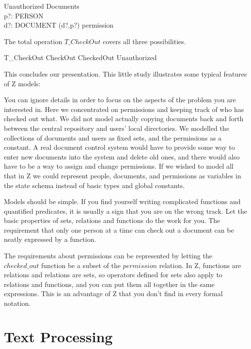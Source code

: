 \documentclass{article}
\begin{document}
\begin{schema}{Unauthorized}
	\Xi Documents \\
	p?: PERSON \\
 	d?: DOCUMENT
\where
	(d?,p?) \notin permission
\end{schema}
The total operation $T\_CheckOut$ covers all three possibilities.

\begin{zed}
	T\_CheckOut  CheckOut \lor CheckedOut \lor Unauthorized
\end{zed}
This concludes our presentation.  This little study illustrates some 
typical features of Z models:

You can ignore details in order to focus on the aspects of the problem
you are interested in.  Here we concentrated on permissions and
keeping track of who has checked out what.  We did not model actually
copying documents back and forth between the central repository and
users' local directories.  We modelled the collections of documents
and users as fixed sets, and the permissions as a constant.  A real
document control system would have to provide some way to enter new
documents into the system and delete old ones, and there would also
have to be a way to assign and change permissions.  If we wished to 
model all that in Z we could represent people, documents, and
permissions as variables in the state schema instead of basic types
and global constants.

Models should be simple.  If you find yourself writing complicated functions
and quantified predicates, it is usually a sign that you are on the wrong
track.  Let the basic properties of sets, relations and functions do the
work for you.  The requirement that only one person at a time can check out
a document can be neatly expressed by a function.

The requirements about permissions can be represented by letting the
$checked\_out$ function be a subset of the $permission$ relation.  In
Z, functions are relations and relations are sets, so operators
defined for sets also apply to relations and functions, and you can
put them all together in the same expressions.  This is an advantage
of Z that you don't find in every formal notation.








\section*{Text Processing}
\end{document}
